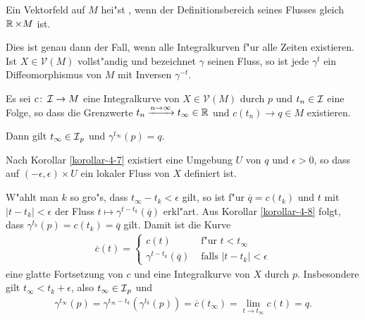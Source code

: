 \begin{Dfn}
  Ein Vektorfeld auf $M$ hei"st , wenn der Definitionsbereich seines Flusses gleich $\operatorname{\mathbb{R}} \times M$ ist.
\end{Dfn}

\begin{bem}
  Dies ist genau dann der Fall, wenn alle Integralkurven f"ur alle Zeiten existieren. Ist $X \in \mathcal V(M)$ vollst"andig und bezeichnet $\gamma$ seinen Fluss, so ist jede $\gamma^t$ ein Diffeomorphismus von $M$ mit Inversen $\gamma^{-t}$.
\end{bem}

\begin{Lemma}
  Es sei $c \colon \operatorname{\mathcal{I}} \to M$ eine Integralkurve von $X \in \mathcal V(M)$ durch $p$ und $t_n \in \operatorname{\mathcal{I}}$ eine Folge, so dass die Grenzwerte $t_n \xrightarrow{n\to\infty} t_{\infty} \in \operatorname{\mathbb{R}}$ und $c(t_n) \to q \in M$ existieren.
  
  Dann gilt $t_{\infty} \in \operatorname{\mathcal{I}}_{p}$ und $\gamma^{t_{\infty}}(p) = q$.
\end{Lemma}

\begin{bew}
  Nach Korollar \ref{korollar-4-7} existiert eine Umgebung $U$ von $q$ und $\epsilon > 0$, so dass auf $(-\epsilon,\epsilon) \times U$ ein lokaler Fluss von $X$ definiert ist.
  
  W"ahlt man $k$ so gro"s, dass $t_{\infty} - t_k < \epsilon$ gilt, so ist f"ur $\overline q = c(t_k)$ und $t$ mit $|t-t_k| < \epsilon$ der Fluss $t \mapsto \gamma^{t-t_k}(\overline q)$ erkl"art. Aus Korollar \ref{korollar-4-8} folgt, dass $\gamma^{t_k}(p) = c(t_k) = \overline q$ gilt.
  Damit ist die Kurve
  \begin{align*}
    \overline c(t) =
    \begin{cases}
      c(t) & \text{ f"ur } t < t_{\infty}\\
      \gamma^{t-t_k}(\overline q) & \text{ falls } |t-t_k| < \epsilon
    \end{cases}
  \end{align*}
  eine glatte Fortsetzung von $c$ und eine Integralkurve von $X$ durch $p$.
  Insbesondere gilt $t_{\infty} < t_k + \epsilon$, also $t_{\infty} \in \operatorname{\mathcal{I}}_p$ und
  \begin{align*}
    \gamma^{t_{\infty}}(p)= \gamma^{t_{\infty}-t_k}(\gamma^{t_k}(p)) = \overline c(t_{\infty}) = \lim_{t\to t_{\infty}}c(t) = q.
  \end{align*}
\end{bew}

